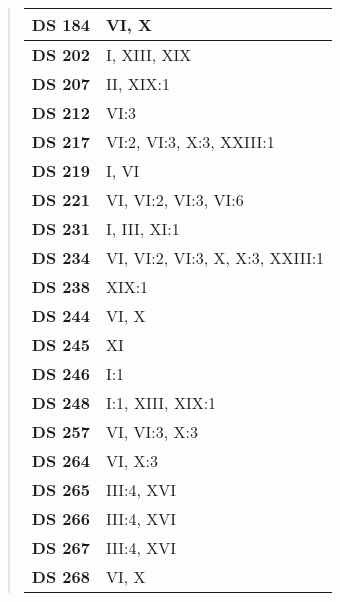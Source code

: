 \begin{quote}
\begin{xltabular}{\linewidth}{ l | X }
        \textbf {DS 184} & VI, X \\ \hline
    
        \textbf {DS 202} & I, XIII, XIX \\ \hline
    
        \textbf {DS 207} & II, XIX:1 \\ \hline
    
        \textbf {DS 212} & VI:3 \\ \hline
    
        \textbf {DS 217} & VI:2, VI:3, X:3, XXIII:1 \\ \hline
    
        \textbf {DS 219} & I, VI \\ \hline
    
        \textbf {DS 221} & VI, VI:2, VI:3, VI:6 \\ \hline
    
        \textbf {DS 231} & I, III, XI:1 \\ \hline
    
        \textbf {DS 234} & VI, VI:2, VI:3, X, X:3, XXIII:1 \\ \hline
    
        \textbf {DS 238} & XIX:1 \\ \hline
    
        \textbf {DS 244} & VI, X \\ \hline
    
        \textbf {DS 245} & XI \\ \hline
    
        \textbf {DS 246} & I:1 \\ \hline
    
        \textbf {DS 248} & I:1, XIII, XIX:1 \\ \hline
    
        \textbf {DS 257} & VI, VI:3, X:3 \\ \hline
    
        \textbf {DS 264} & VI, X:3 \\ \hline
    
        \textbf {DS 265} & III:4, XVI \\ \hline
    
        \textbf {DS 266} & III:4, XVI \\ \hline
    
        \textbf {DS 267} & III:4, XVI \\ \hline
    
        \textbf {DS 268} & VI, X \\ \hline
    

\end{xltabular}
\end{quote}
